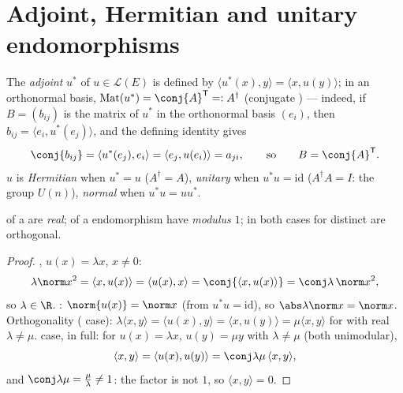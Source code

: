 \section{Adjoint, Hermitian and unitary endomorphisms}

\begin{definition}\label{def:b2:hermitian:adjoint}
The \emph{adjoint} $u^*$ of $u \in \mathcal{L}(E)$ is defined by
$\langle u^*(x), y\rangle = \langle x, u(y)\rangle$; in an
orthonormal basis, $\operatorname{Mat}(u^*) = \conj{A}^{\mathsf T} =:
A^{\dagger}$ (conjugate ) --- indeed, if $B =
(b_{ij})$ is the matrix of $u^*$ in the orthonormal basis
$(e_i)$, then $b_{ij} = \langle e_i, u^*(e_j)\rangle$, and the
defining identity gives
\[
\conj{b_{ij}}
= \langle u^*(e_j), e_i\rangle
= \langle e_j, u(e_i)\rangle = a_{ji} ,
\qquad\text{so}\qquad
B = \conj{A}^{\mathsf T} .
\] $u$ is
\emph{Hermitian} when $u^* = u$
($A^\dagger = A$), \emph{unitary} when $u^*u =
\mathrm{id}$ ($A^\dagger A = I$: the group $U(n)$), \emph{normal}
when $u^*u = uu^*$.
\end{definition}

\begin{proposition}\label{prop:b2:hermitian:eigenvalues}
 of a  are \emph{real};
 of a  endomorphism have \emph{modulus $1$}; in
both cases  for distinct  are orthogonal.
\end{proposition}

\begin{proof}
, $u(x) = \lambda x$, $x \neq 0$:
\[
\lambda \norm x^2 = \langle x, u(x)\rangle = \langle u(x), x\rangle
= \conj{\langle x, u(x)\rangle} = \conj\lambda\,\norm x^2 ,
\]
so $\lambda \in \R$. : $\norm{u(x)} = \norm x$ (from $u^*u =
\mathrm{id}$), so $\abs\lambda\norm x = \norm x$. Orthogonality
( case): $\lambda\langle x, y\rangle = \langle u(x),
y\rangle = \langle x, u(y)\rangle = \mu\langle x, y\rangle$ for
 with real $\lambda \neq \mu$.  case, in
full: for $u(x) = \lambda x$, $u(y) = \mu y$ with $\lambda \neq
\mu$ (both unimodular),
\[
\langle x, y\rangle = \langle u(x), u(y)\rangle
= \conj\lambda\mu\,\langle x, y\rangle ,
\]
and $\conj\lambda\mu = \frac{\mu}{\lambda} \neq 1$: the factor
is not $1$, so $\langle x, y\rangle = 0$.
\end{proof}

